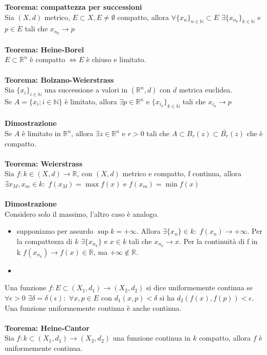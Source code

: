 \documentclass{article}
\begin{document}
\textbf{Teorema: compattezza per successioni}\\
Sia $(X,d)$ metrico, $E\subset X,E\neq\emptyset$ compatto, allora $\forall\{x_n\}_{n\in\mathds{N}}\subset E$ $\exists\{x_{n_k}\}_{k\in\mathds{N}}$ e $p\in E$ tali che $x_{n_k}\rightarrow p$\\\\
\textbf{Teorema: Heine-Borel}\\
$E\subset\mathds{R}^n$ è compatto $\Leftrightarrow E$ è chiuso e limitato.\\\\
\textbf{Teorema: Bolzano-Weierstrass}\\
Sia $\{x_i\}_{i\in\mathds{N}}$ una successione a valori in $(\mathds{R}^n,d)$ con $d$ metrica euclidea.\\ Se $A=\{x_i;i\in\mathds{N}\}$ è limitato, allora $\exists p\in\mathds{R}^n$ e $\{x_{i_k}\}_{k\in\mathds{N}}$ tali che $x_{i_n}\rightarrow p$\\\\
\textbf{Dimostrazione}\\
Se $A$ è limitato in $\mathds{R}^n$, allora $\exists z\in\mathds{R}^n$ e $r>0$ tali che $A\subset B_r(z)\subset \bar{B_r}(z)$ che è compatto.\\
\\
\textbf{Teorema: Weierstrass}\\
Sia $f:k\in(X,d)\rightarrow\mathds{R}$, con $(X,d)$ metrico e compatto, f continua, allora $\exists x_M,x_m\in k:$ $f(x_M)=\max f(x)$ e $f(x_m)=\min f(x)$\\\\
\textbf{Dimostrazione}\\
Considero solo il massimo, l'altro caso è analogo.
\begin{itemize}
    \item supponiamo per assurdo $\sup k=+\infty$. Allora $\exists \{x_n\}\in k:$ $f(x_n)\rightarrow+\infty$. Per la compattezza di $k$ $\exists \{x_{n_k}\}$ e $x\in k$ tali che $x_{n_k}\rightarrow x$. Per la continuità di f in k $f(x_{n_k})\rightarrow f(x)\in\mathds{R}$, ma $+\infty\notin\mathds{R}$.
    
    \item
\end{itemize}
Una funzione $f:E\subset(X_1,d_1)\rightarrow(X_2,d_2)$ si dice uniformemente continua se $\forall\epsilon>0$ $\exists\delta=\delta(\epsilon):$ $\forall x,p\in E$ con $d_1(x,p)<\delta$ si ha $d_2(f(x),f(p))<\epsilon$. Una funzione uniformemente continua è anche continua.\\\\
\textbf{Teorema: Heine-Cantor}\\
Sia $f:k\subset(X_1,d_1)\rightarrow(X_2,d_2)$ una funzione continua in $k$ compatto, allora $f$ è uniformemente continua.
\end{document}
